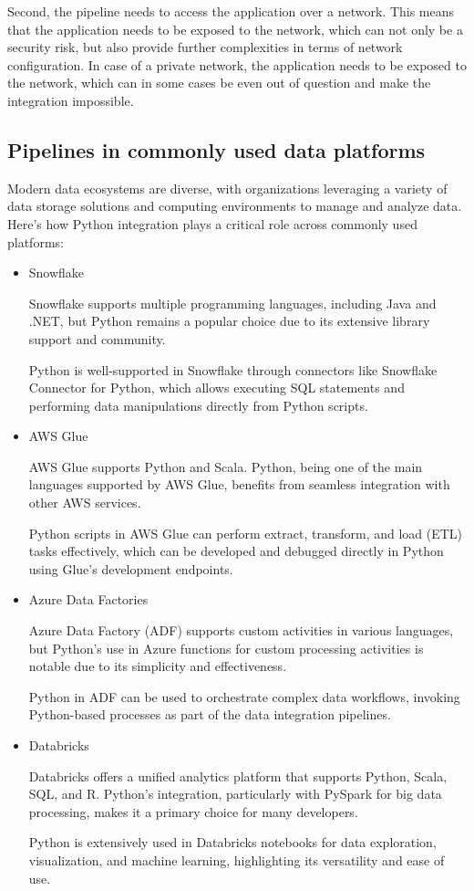 Second, the pipeline needs to access the application over a network. This means that the application needs to be exposed to the network, which can not only be a security risk, but also provide further complexities in terms of network configuration. In case of a private network, the application needs to be exposed to the network, which can in some cases be even out of question and make the integration impossible.

\subsection{Pipelines in commonly used data platforms}

Modern data ecosystems are diverse, with organizations leveraging a variety of data storage solutions and computing environments to manage and analyze data. Here’s how Python integration plays a critical role across commonly used platforms:

\begin{itemize}
\item  Snowflake

Snowflake supports multiple programming languages, including Java and .NET, but Python remains a popular choice due to its extensive library support and community.

Python is well-supported in Snowflake through connectors like Snowflake Connector for Python, which allows executing SQL statements and performing data manipulations directly from Python scripts.


\item AWS Glue

    AWS Glue supports Python and Scala. Python, being one of the main languages supported by AWS Glue, benefits from seamless integration with other AWS services.
    
    Python scripts in AWS Glue can perform extract, transform, and load (ETL) tasks effectively, which can be developed and debugged directly in Python using Glue’s development endpoints.


    \item Azure Data Factories

    Azure Data Factory (ADF) supports custom activities in various languages, but Python’s use in Azure functions for custom processing activities is notable due to its simplicity and effectiveness.
   
    Python in ADF can be used to orchestrate complex data workflows, invoking Python-based processes as part of the data integration pipelines.


    \item Databricks

    Databricks offers a unified analytics platform that supports Python, Scala, SQL, and R. Python’s integration, particularly with PySpark for big data processing, makes it a primary choice for many developers.

    Python is extensively used in Databricks notebooks for data exploration, visualization, and machine learning, highlighting its versatility and ease of use.

\end{itemize}


